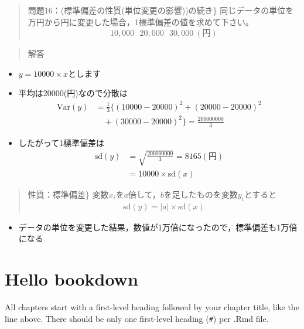 \documentclass[
]{book}
\providecommand{\tightlist}{%
  \setlength{\itemsep}{0pt}\setlength{\parskip}{0pt}}
\theoremstyle{definition}
\theoremstyle{definition}
\theoremstyle{definition}
\theoremstyle{definition}
\theoremstyle{remark}
\begin{document}
\begin{quote}
問題16：(標準偏差の性質(単位変更の影響))の続き\}
同じデータの単位を万円から円に変更した場合，1標準偏差の値を求めて下さい。
\begin{align*}
10,000~~~20,000~~~30,000~(\text{円})
\end{align*}
\end{quote}

\begin{quote}
解答
\end{quote}

\begin{itemize}
\tightlist
\item
  \(y=10000 \times x\)とします
\item
  平均は20000(円)なので分散は
  \begin{align*}
  \text{Var}(y)&=\frac{1}{3} \{ (10000-20000)^2+(20000-20000)^2 \\
  &\quad +(30000-20000)^2 \}=\frac{200000000}{3}
  \end{align*}
\item
  したがって1標準偏差は
  \begin{align*}
  \text{sd}(y)
  &=\sqrt{\frac{200000000}{3}}=8165(\text{円}) \\
  &=10000 \times \text{sd}(x)
  \end{align*}
\end{itemize}

\begin{quote}
性質：標準偏差\}
変数\(x_i\)を\(a\)倍して，\(b\)を足したものを変数\(y_i\)とすると
\begin{align*}
\text{sd}(y)=|a| \times \text{sd}(x)
\end{align*}
\end{quote}

\begin{itemize}
\tightlist
\item
  データの単位を変更した結果，数値が1万倍になったので，標準偏差も1万倍になる
\end{itemize}

\hypertarget{hello-bookdown}{%
\chapter{Hello bookdown}\label{hello-bookdown}}

All chapters start with a first-level heading followed by your chapter title, like the line above. There should be only one first-level heading (\texttt{\#}) per .Rmd file.
\end{document}
